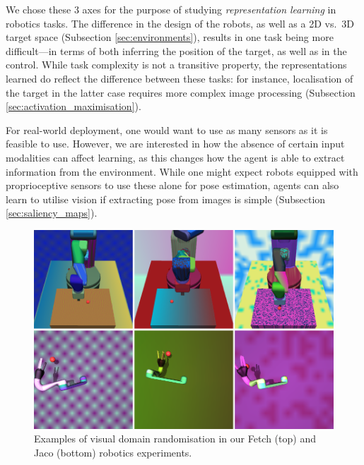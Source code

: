 We chose these 3 axes for the purpose of studying \emph{representation learning} in robotics tasks. The difference in the design of the robots, as well as a 2D vs.~3D target space (Subsection \ref{sec:environments}), results in one task being more difficult---in terms of both inferring the position of the target, as well as in the control. While task complexity is not a transitive property, the representations learned do reflect the difference between these tasks: for instance, localisation of the target in the latter case requires more complex image processing (Subsection \ref{sec:activation_maximisation}).

For real-world deployment, one would want to use as many sensors as it is feasible to use. However, we are interested in how the absence of certain input modalities can affect learning, as this changes how the agent is able to extract information from the environment. While one might expect robots equipped with proprioceptive sensors to use these alone for pose estimation, agents can also learn to utilise vision if extracting pose from images is simple (Subsection \ref{sec:saliency_maps}).

\begin{figure}
  \centering
  \includegraphics[width=\linewidth]{figures/chapter6/domain_random.png}
  \caption{Examples of visual domain randomisation in our Fetch (top) and Jaco (bottom) robotics experiments.}
  \label{fig:dr_example}
\end{figure}
\setlength{\textfloatsep}{5pt}

